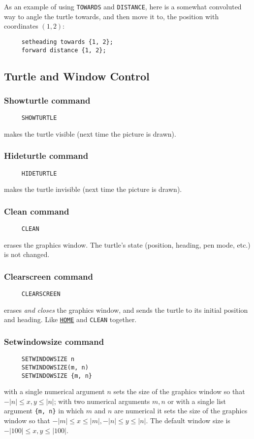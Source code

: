 As an example of using \texttt{TOWARDS} and \texttt{DISTANCE}, here is
a somewhat convoluted way to angle the turtle towards, and then move
it to, the position with coordinates $(1,2)$:
\begin{verbatim}
     setheading towards {1, 2};
     forward distance {1, 2};
\end{verbatim}


\subsection{Turtle and Window Control}
\label{logoturtle:TWC}

\subsubsection*{Showturtle command}
\begin{verbatim}
     SHOWTURTLE
\end{verbatim}
\label{logoturtle:showturtle}
makes the turtle visible (next time the picture is drawn).

\subsubsection*{Hideturtle command}
\begin{verbatim}
     HIDETURTLE
\end{verbatim}
\label{logoturtle:hideturtle}
makes the turtle invisible (next time the picture is drawn).

\subsubsection*{Clean command}
\begin{verbatim}
     CLEAN
\end{verbatim}
erases the graphics window.  The turtle's state (position, heading,
pen mode, etc.) is not changed.

\subsubsection*{Clearscreen command}
\begin{verbatim}
     CLEARSCREEN
\end{verbatim}
erases \emph{and closes} the graphics window, and sends the turtle to
its initial position and heading.  Like
\texttt{\hyperref[logoturtle:home]{HOME}} and \texttt{CLEAN} together.

\subsubsection*{Setwindowsize command}
\begin{verbatim}
     SETWINDOWSIZE n
     SETWINDOWSIZE(m, n)
     SETWINDOWSIZE {m, n}
\end{verbatim}
with a single numerical argument $n$ sets the size of the graphics
window so that $-|n| \le x,y \le |n|$; with two numerical arguments
$m, n$ or with a single list argument \texttt{\{m, n\}} in which $m$
and $n$ are numerical it sets the size of the graphics window so that
$-|m| \le x \le |m|, -|n| \le y \le |n|$.  The default window size is
$-|100| \le x,y \le |100|$.

